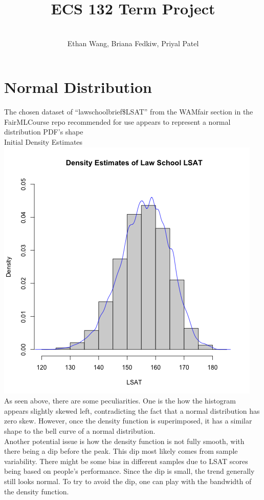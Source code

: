 \documentclass[12pt, letterpaper]{article}
\title{ECS 132 Term Project}
\author{\\ Ethan Wang, Briana Fedkiw, Priyal Patel}
\date{}
\begin{document}
\maketitle

\newpage
\noindent
\section*{Normal Distribution}
\normalsize
The chosen dataset of ``lawschoolbrief\$LSAT'' from the WAMfair section in the FairMLCourse repo recommended for use appears to represent a normal distribution PDF's shape \\
Initial Density Estimates\\
\includegraphics[scale=0.85]{Lawschool_LSAT_Density}\\
As seen above, there are some peculiarities. One is the how the histogram appears slightly skewed left, contradicting the fact that a normal distribution has zero skew. However, once the density function is superimposed, it has a similar shape to the bell curve of a normal distribution. \\
Another potential issue is how the density function is not fully smooth, with there being a dip before the peak. This dip most likely comes from sample variability. There might be some bias in different samples due to LSAT scores being based on people's performance. Since the dip is small, the trend generally still looks normal. To try to avoid the dip, one can play with the bandwidth of the density function. \\
\end{document}

